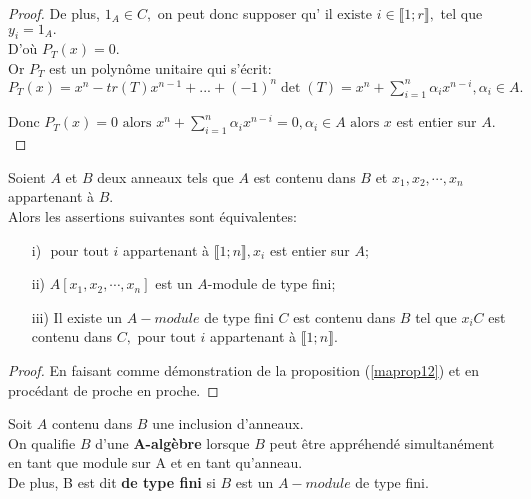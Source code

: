 \begin{proof}
	De plus, $1_A\in C,$ on peut donc supposer qu' $\text{il existe } i\in \llbracket 1; r \rrbracket ,$ tel que $y_{i}=1_A.$\\
	D'où $P_{T}(x)=0.$\\
	Or $P_{T}$ est un polynôme unitaire qui s'écrit:\\ $P_{T}(x)=x^{n}-tr(T)x^{n-1}+...+(-1)^{n}\det
	(T)=x^{n}+\sum\limits_{i=1}^{n}\alpha _{i}x^{n-i},\alpha _{i}\in A.$
	
	Donc $P_{T}(x)=0\text{ alors } x^{n}+\sum\limits_{i=1}^{n}\alpha
	_{i}x^{n-i}=0,\alpha _{i}\in A\text{ alors } x$ est entier sur $A.$
	
\end{proof}
\begin{moncorollaire}
	Soient $A$ et $B$ deux anneaux tels que $A $ est contenu dans $  B$ et $x_1, x_2, \cdots, x_n $ appartenant à $ B$.\\
	Alors les assertions suivantes sont équivalentes:
	\begin{enumerate}
		\item[i)]$\text{ pour tout } i $ appartenant à $ \llbracket 1; n \rrbracket, x_i$ est entier sur $A$;
		\item[ii)]$A[x_1, x_2, \cdots, x_n]$ est un $A$-module de type fini;
		\item[iii)]Il existe un $A-module$ de type fini $C $ est contenu dans $  B$ tel que $x_i C $ est contenu dans $  C, \text{ pour tout } i $ appartenant à $ \llbracket 1; n \rrbracket$.
	\end{enumerate}
\end{moncorollaire}
\begin{proof}
	En faisant comme démonstration de la proposition (\ref{maprop12}) et en procédant de proche en proche. 
\end{proof}

\begin{madefinition}
	Soit $A $ contenu dans $ B$ une inclusion d'anneaux.\\
	On qualifie $B$ d'une \textbf{A-algèbre} lorsque $B$ peut être appréhendé simultanément en tant que module sur A et en tant qu'anneau.\\
	De plus, B est dit \textbf{de type fini} si $B$ est un $A-module$ de type fini.
\end{madefinition}

